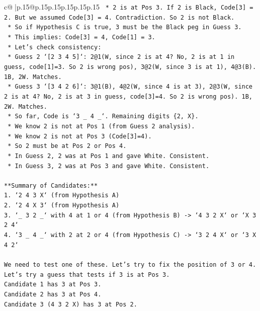 \documentclass{article}
\begin{document}
{\begin{supertabular}{c@{$\;$}|p{.15\linewidth}@{}p{.15\linewidth}p{.15\linewidth}p{.15\linewidth}p{.15\linewidth}p{.15\linewidth}}
{{{\texttt{        *   2 is at Pos 3. If 2 is Black, Code{[}3{]} = 2. But we assumed Code{[}3{]} = 4. Contradiction. So 2 is not Black.} \\
\texttt{        *   So if Hypothesis C is true, 3 must be the Black peg in Guess 3.} \\
\texttt{        *   This implies: Code{[}3{]} = 4, Code{[}1{]} = 3.} \\
\texttt{        *   Let's check consistency:} \\
\texttt{            *   Guess 2 `{[}2 3 4 5{]}`: 2@1(W, since 2 is at 4? No, 2 is at 1 in guess, code{[}1{]}=3. So 2 is wrong pos), 3@2(W, since 3 is at 1), 4@3(B). 1B, 2W. Matches.} \\
\texttt{            *   Guess 3 `{[}3 4 2 6{]}`: 3@1(B), 4@2(W, since 4 is at 3), 2@3(W, since 2 is at 4? No, 2 is at 3 in guess, code{[}3{]}=4. So 2 is wrong pos). 1B, 2W. Matches.} \\
\texttt{    *   So far, Code is `3 \_ 4 \_`. Remaining digits \{2, X\}.} \\
\texttt{    *   We know 2 is not at Pos 1 (from Guess 2 analysis).} \\
\texttt{    *   We know 2 is not at Pos 3 (Code{[}3{]}=4).} \\
\texttt{    *   So 2 must be at Pos 2 or Pos 4.} \\
\texttt{    *   In Guess 2, 2 was at Pos 1 and gave White. Consistent.} \\
\texttt{    *   In Guess 3, 2 was at Pos 3 and gave White. Consistent.} \\
\\ 
\texttt{**Summary of Candidates:**} \\
\texttt{1.  `2 4 3 X` (from Hypothesis A)} \\
\texttt{2.  `2 4 X 3` (from Hypothesis A)} \\
\texttt{3.  `\_ 3 2 \_` with 4 at 1 or 4 (from Hypothesis B) {-}> `4 3 2 X` or `X 3 2 4`} \\
\texttt{4.  `3 \_ 4 \_` with 2 at 2 or 4 (from Hypothesis C) {-}> `3 2 4 X` or `3 X 4 2`} \\
\\ 
\texttt{We need to test one of these. Let's try to fix the position of 3 or 4.} \\
\texttt{Let's try a guess that tests if 3 is at Pos 3.} \\
\texttt{Candidate 1 has 3 at Pos 3.} \\
\texttt{Candidate 2 has 3 at Pos 4.} \\
\texttt{Candidate 3 (4 3 2 X) has 3 at Pos 2.} \\
}}}
\end{supertabular}}
\end{document}
